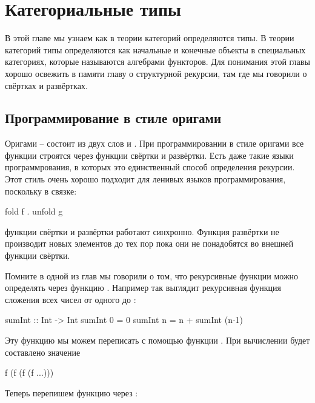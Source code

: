 \setcounter{chapter}{15}
\chapter{Категориальные типы}

В этой главе мы узнаем как в теории категорий 
определяются типы. В теории категорий типы
определяются как начальные и конечные объекты
в специальных категориях, которые называются алгебрами
функторов. Для понимания этой главы хорошо освежить в памяти
главу о структурной рекурсии, там где мы говорили
о свёртках и развёртках. 

\section{Программирование в стиле оригами}

Оригами -- состоит из двух слов  и . 
При программировании в стиле оригами все функции строятся
через функции свёртки и развёртки. Есть даже такие языки программрования,
в которых это единственный способ определения рекурсии.
Этот стиль очень хорошо подходит для ленивых языков программирования,
поскольку в связке:

\begin{code}
fold f . unfold g
\end{code}

\noindent функции свёртки и развёртки работают синхронно.
Функция развёртки не производит новых элементов до тех пор 
пока они не понадобятся во внешней функции свёртки.

Помните в одной из глав мы говорили о том, что рекурсивные
функции можно определять через функцию .  
Например так выглядит рекурсивная функция сложения всех чисел от 
одного до :

\begin{code}
sumInt :: Int -> Int
sumInt 0 = 0
sumInt n = n + sumInt (n-1)
\end{code}

Эту функцию мы можем переписать с помощью функции .
При вычислении  будет составлено значение 

\begin{code}
f (f (f (f ...)))
\end{code}

Теперь перепишем функцию  через :


